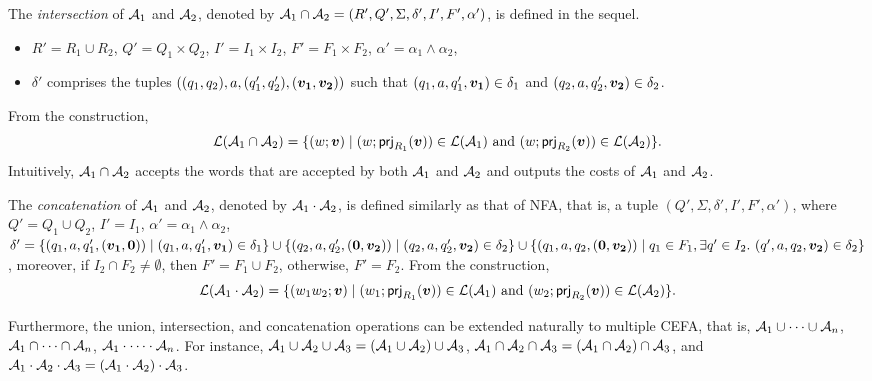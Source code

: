 The \emph{intersection} of $\mathcal{A}_1$ and $\mathcal{A}_2$, denoted by $\mathcal{A}_1 \cap \mathcal{A}_2 = (R', Q', \Sigma, \delta', I', F', \alpha')$, is defined in the sequel. 
\begin{itemize}
\item $R' = R_1 \cup R_2$, $Q' = Q_1 \times Q_2$, $I' = I_1 \times I_2$, $F' = F_1 \times F_2$, $\alpha' = \alpha_1 \wedge \alpha_2$, 
\item $\delta'$ comprises the tuples $((q_1, q_2), a, (q'_1, q'_2), (\myvec{v_1}, \myvec{v_2}))$ such that $(q_1,a, q'_1, \myvec{v_1}) \in \delta_1$ and $(q_2,a, q'_2, \myvec{v_2}) \in \delta_2$.
\end{itemize}
From the construction, 
$$\Lang(\aut_1 \cap \aut_2) = \{(w; \myvec{v}) \mid (w; \prj_{R_1}(\myvec{v})) \in \Lang(\aut_1) \mbox{ and } (w; \prj_{R_2}(\myvec{v})) \in \Lang(\aut_2)\}.$$
Intuitively, $\mathcal{A}_1 \cap \mathcal{A}_2$ accepts the words that are accepted by both $\mathcal{A}_1$ and $\mathcal{A}_2$ and outputs the costs of $\mathcal{A}_1$ and $\mathcal{A}_2$.  

The \emph{concatenation} of $\mathcal{A}_1$ and $\mathcal{A}_2$, denoted by $\mathcal{A}_1 \cdot \mathcal{A}_2$, is defined similarly as that of NFA, that is, a tuple $(Q', \Sigma, \delta', I', F', \alpha')$, where $Q' = Q_1 \cup Q_2$, $I' = I_1$, $\alpha' = \alpha_1 \wedge \alpha_2$, $\delta' = \{(q_1, a, q'_1, (\myvec{v_1}, \myvec{0})) \mid (q_1, a, q'_1, \myvec{v_1}) \in \delta_1\} \cup \{(q_2, a, q'_2, (\myvec{0}, \myvec{v_2})) \mid (q_2, a, q'_2, \myvec{v_2}) \in \delta_2\} \cup \{(q_1, a, q_2, (\myvec{0}, \vec{v_2})) \mid q_1 \in F_1, \exists q' \in I_2.\ (q', a, q_2, \vec{v_2}) \in \delta_2\}$, moreover, if $I_2 \cap F_2 \neq \emptyset$, then $F'= F_1 \cup F_2$, otherwise, $F'= F_2$. From the construction, 
$$\Lang(\aut_1 \concat \aut_2) = \{(w_1w_2; \myvec{v}) \mid (w_1; \prj_{R_1}(\myvec{v})) \in \Lang(\aut_1) \mbox{ and }(w_2; \prj_{R_2}(\myvec{v})) \in \Lang(\aut_2)\}.$$

Furthermore, the union, intersection, and concatenation operations can be extended naturally to multiple CEFA, that is, $\mathcal{A}_1 \cup \cdots \cup \mathcal{A}_n$, $\mathcal{A}_1 \cap \cdots \cap \mathcal{A}_n$, $\mathcal{A}_1 \cdot \cdots \cdot \mathcal{A}_n$. For instance, $\mathcal{A}_1 \cup \mathcal{A}_2 \cup \mathcal{A}_3 = (\mathcal{A}_1 \cup \mathcal{A}_2) \cup \mathcal{A}_3$, $\mathcal{A}_1 \cap \mathcal{A}_2 \cap \mathcal{A}_3 = (\mathcal{A}_1 \cap \mathcal{A}_2) \cap \mathcal{A}_3$, and $\mathcal{A}_1 \cdot \mathcal{A}_2 \cdot \mathcal{A}_3 = (\mathcal{A}_1 \cdot \mathcal{A}_2) \cdot \mathcal{A}_3$.